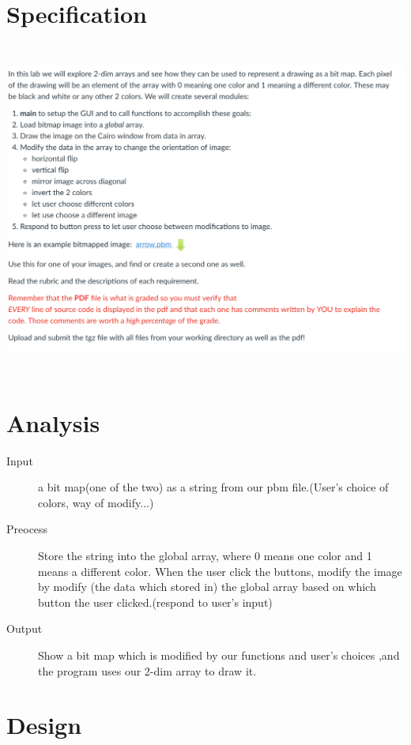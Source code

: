 \documentclass{article}
\begin{document}
\large 
\section*{Specification}
\includegraphics[width = 15cm, height = 11cm]{lab51.png}
\newpage\section*{Analysis}
\begin{description}
	\item[Input] a bit map(one of the two) as a string from our pbm file.(User's choice of 
	colors, way of modify...)
	\item[Preocess] Store the string into the global array, where 0 means one color and 1 means a different color. When the user click the buttons, modify the image by modify (the data which stored in) the global array based on which button the user clicked.(respond to user's input)
	\item[Output] Show a bit map which is modified by our functions and 
	user's choices ,and the program uses our 2-dim array to draw it.
\end{description}
\newpage\section*{Design}
\end{document}
